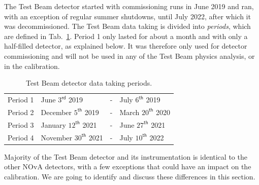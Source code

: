 
The Test Beam detector started with commissioning runs in June 2019 and ran, with an exception of regular summer shutdowns, until July 2022, after which it was decommissioned. The Test Beam data taking is divided into \textit{periods}, which are defined in Tab.~\ref{tab:TestBeamPeriods}. Period 1 only lasted for about a month and with only a half-filled detector, as explained below. It was therefore only used for detector commissioning and will not be used in any of the Test Beam physics analysis, or in the calibration.
\begin{table}[!ht]
\centering
\caption{Test Beam detector data taking periods.}
\def\arraystretch{1.4}
\begin{tabular}{l@{\hskip 1in}lcl}
Period 1 & June $3^{\textsf{rd}}$ 2019 & - & July $6^{\textsf{th}}$ 2019\\
Period 2 & December $5^{\textsf{th}}$ 2019 & - & March $20^{\textsf{th}}$ 2020\\
Period 3 & January $12^{\textsf{th}}$ 2021 & - & June $27^{\textsf{th}}$ 2021\\
Period 4 & November $30^{\textsf{th}}$ 2021 & - & July $10^{\textsf{th}}$ 2022
\end{tabular}
\label{tab:TestBeamPeriods}
\end{table}

Majority of the Test Beam detector and its instrumentation is identical to the other \gls{NOvA} detectors, with a few exceptions that could have an impact on the calibration. We are going to identify and discuss these differences in this section.


